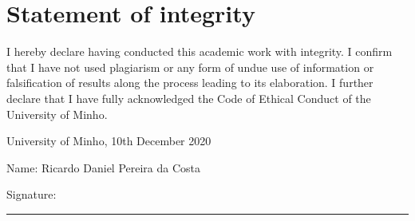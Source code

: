 
\chapter*{Statement of integrity}

I hereby declare having conducted this academic work with integrity.
I confirm that I have not used plagiarism or any form of undue use of information or falsification of results along the process leading to its elaboration. 
I further declare that I have fully acknowledged the Code of Ethical Conduct of the University of Minho.

\vspace{0.5cm}

\noindent University of Minho, 10th December 2020

\vspace{0.5cm}

\noindent Name: Ricardo Daniel Pereira da Costa

\vspace{0.5cm}

\noindent Signature:~\rule{10cm}{0.5pt}

